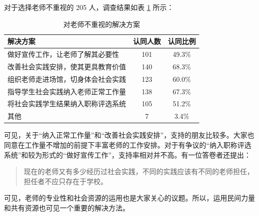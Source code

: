 \documentclass[12pt,UTF8]{ctexart}
\begin{document}
\par {
	对于选择老师不重视的 205 人，调查结果如表 \ref{fig:12} 所示：
	\begin{table}[htbp]
		\centering
		\caption{对老师不重视的解决方案}
		\label{fig:12}
		\begin{tabular}{lcc}
			\hline
			\hline
			{\bf 解决方案} & {\bf 认同人数} & {\bf 认同比例}\\ \hline
			做好宣传工作，让老师了解其必要性 & 101 & 49.3\% \\
			改善社会实践安排，使其更具教育价值 & 140 & 68.3\% \\
			组织老师走进场馆，切身体会社会实践 & 123 & 60.0\% \\
			指导学生社会实践纳入老师正常工作量 & 138 & 67.3\% \\
			将社会实践学生结果纳入职称评选系统 & 105 & 51.2\% \\
			其他 & 7 & 3.4\% \\
			\hline
			\hline
		\end{tabular}
	\end{table}
	
	可见，关于“纳入正常工作量”和“改善社会实践安排”，支持的朋友比较多。大家也同意在工作量不增加的前提下丰富老师的工作安排。对于有争议的“纳入职称评选系统”和较为形式的“做好宣传工作”，支持率相对并不高。有一位答卷者还提出：
	\begin{quote}
		\kaishu 现在的老师又有多少经历过社会实践，不同的实践应该有不同的老师担任，担任者不应只存在于学校。
	\end{quote}
	可见，老师的专业性和社会资源的运用也是大家关心的议题。所以，运用民间力量和共有资源也可见一个重要的解决方法。
}
\end{document}
